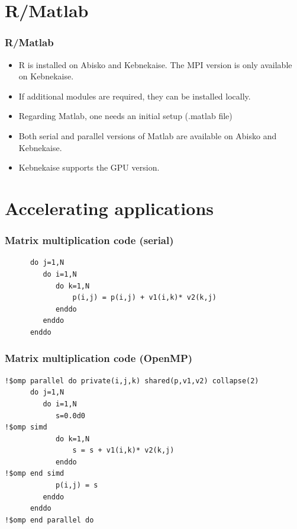 %

\section{R/Matlab}

\begin{frame}[fragile]
	\frametitle{R/Matlab}
\begin{itemize}
\item R is installed on Abisko and Kebnekaise. The MPI version
is only available on Kebnekaise. 

\item If additional modules are required, they can be installed 
locally. 

\item Regarding Matlab, one needs an initial setup (.matlab file)

\item Both serial and parallel versions of Matlab are available
on Abisko and Kebnekaise.

\item Kebnekaise supports the GPU version.
\end{itemize}

\end{frame}

\section{Accelerating applications}

\begin{frame}[fragile]
	\frametitle{Matrix multiplication code (serial)}
{\small 
        \begin{verbatim}             
      do j=1,N
         do i=1,N
            do k=1,N
                p(i,j) = p(i,j) + v1(i,k)* v2(k,j)
            enddo
         enddo
      enddo
        \end{verbatim}
}
\end{frame}


\begin{frame}[fragile]
	\frametitle{Matrix multiplication code (OpenMP)}
{\small 
        \begin{verbatim}             
!$omp parallel do private(i,j,k) shared(p,v1,v2) collapse(2)
      do j=1,N
         do i=1,N
            s=0.0d0
!$omp simd 
            do k=1,N
                s = s + v1(i,k)* v2(k,j)
            enddo
!$omp end simd
            p(i,j) = s
         enddo
      enddo
!$omp end parallel do
        \end{verbatim}
}
\end{frame}

